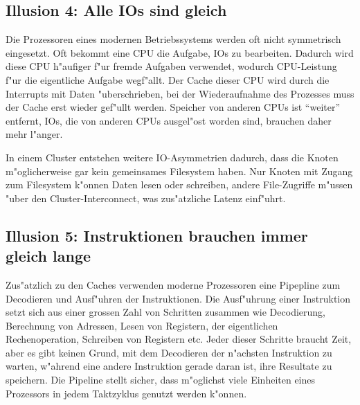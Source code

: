 \subsection{Illusion 4: Alle IOs sind gleich}
Die Prozessoren eines modernen Betriebssystems werden oft nicht symmetrisch
eingesetzt.
Oft bekommt eine CPU die Aufgabe, IOs zu bearbeiten.
Dadurch wird diese CPU h"aufiger f"ur fremde Aufgaben verwendet, wodurch
CPU-Leistung f"ur die eigentliche Aufgabe wegf"allt.
Der Cache dieser CPU wird durch die Interrupts mit Daten "uberschrieben,
bei der Wiederaufnahme des Prozesses muss der Cache erst wieder
gef"ullt werden.
Speicher von anderen CPUs ist ``weiter'' entfernt, IOs, die von anderen
CPUs ausgel"ost worden sind, brauchen daher mehr l"anger.

In einem Cluster entstehen weitere IO-Asymmetrien dadurch, dass
die Knoten m"oglicherweise gar kein gemeinsames Filesystem haben.
Nur Knoten mit Zugang zum Filesystem k"onnen Daten lesen oder schreiben,
andere File-Zugriffe m"ussen "uber den Cluster-Interconnect, was
zus"atzliche Latenz einf"uhrt.

\subsection{Illusion 5: Instruktionen brauchen immer gleich lange}
Zus"atzlich zu den Caches verwenden moderne Prozessoren eine Pipepline
zum Decodieren und Ausf"uhren der Instruktionen.
Die Ausf"uhrung einer Instruktion setzt sich aus einer grossen Zahl
von Schritten zusammen wie Decodierung, Berechnung von Adressen,
Lesen von Registern, der eigentlichen Rechenoperation, Schreiben
von Registern etc.
Jeder dieser Schritte braucht Zeit, aber es gibt keinen Grund, mit
dem Decodieren der n"achsten Instruktion zu warten, w"ahrend eine
andere Instruktion gerade daran ist, ihre Resultate zu speichern.
Die Pipeline stellt sicher, dass m"oglichst viele Einheiten eines
Prozessors in jedem Taktzyklus genutzt werden k"onnen.

